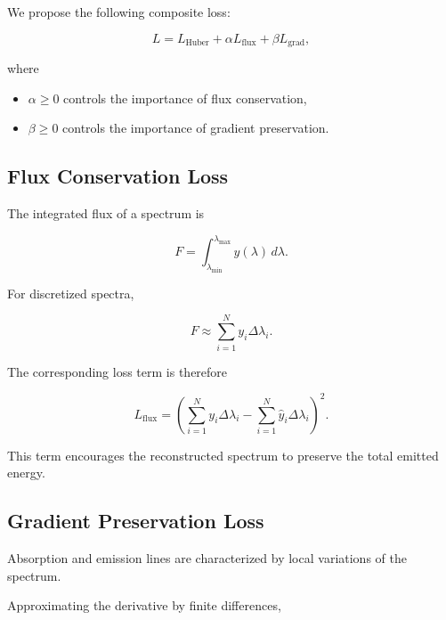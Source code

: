 \documentclass[11pt,a4paper]{article}
\begin{document}
We propose the following composite loss:

\begin{equation}
L
=
L_{\mathrm{Huber}}
+
\alpha L_{\mathrm{flux}}
+
\beta L_{\mathrm{grad}},
\end{equation}

where

\begin{itemize}
    \item $\alpha\ge0$ controls the importance of flux conservation,
    \item $\beta\ge0$ controls the importance of gradient preservation.
\end{itemize}


\subsection{Flux Conservation Loss}

The integrated flux of a spectrum is

\begin{equation}
F
=
\int_{\lambda_{\min}}^{\lambda_{\max}}
y(\lambda)\,d\lambda.
\end{equation}

For discretized spectra,

\begin{equation}
F
\approx
\sum_{i=1}^{N}
y_i\Delta\lambda_i.
\end{equation}

The corresponding loss term is therefore

\begin{equation}
L_{\mathrm{flux}}
=
\left(
\sum_{i=1}^{N}
y_i\Delta\lambda_i
-
\sum_{i=1}^{N}
\hat{y}_i\Delta\lambda_i
\right)^2.
\end{equation}

This term encourages the reconstructed spectrum to preserve the total emitted energy.


\subsection{Gradient Preservation Loss}

Absorption and emission lines are characterized by local variations of the spectrum.

Approximating the derivative by finite differences,
\end{document}
